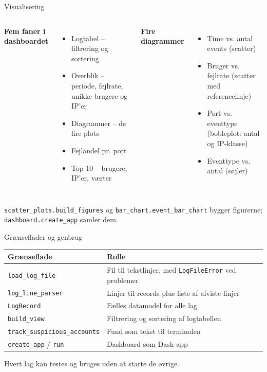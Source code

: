 \documentclass[aspectratio=169,10pt]{beamer}
\newcommand{\code}[1]{\texttt{\small #1}}
\begin{document}
\begin{frame}{Visualisering}
  \begin{columns}[T]
      \textbf{Fem faner i dashboardet}
      \vspace{0.3em}
      \begin{itemize}
        \item Logtabel -- filtrering og sortering
        \item Overblik -- periode, fejlrate, unikke brugere og IP'er
        \item Diagrammer -- de fire plots
        \item Fejlandel pr. port
        \item Top 10 -- brugere, IP'er, værter
      \end{itemize}
      \textbf{Fire diagrammer}
      \vspace{0.3em}
      \begin{itemize}
        \item Time vs. antal events (scatter)
        \item Bruger vs. fejlrate (scatter med referencelinje)
        \item Port vs. eventtype (bobleplot: antal og IP-klasse)
        \item Eventtype vs. antal (søjler)
      \end{itemize}
  \end{columns}
  \vfill
  {\footnotesize\color{muted}\code{scatter\_plots.build\_figures} og \code{bar\_chart.event\_bar\_chart} bygger figurerne; \code{dashboard.create\_app} samler dem.}
\end{frame}

\begin{frame}{Grænseflader og genbrug}
  \centering
  \small
  \begin{tabularx}{\textwidth}{@{}l X@{}}
    \toprule
    \textbf{Grænseflade} & \textbf{Rolle} \\
    \midrule
    \code{load\_log\_file}        & Fil til tekstlinjer, med \code{LogFileError} ved problemer \\
    \code{log\_line\_parser}      & Linjer til records plus liste af afviste linjer \\
    \code{LogRecord}              & Fælles datamodel for alle lag \\
    \code{build\_view}            & Filtrering og sortering af logtabellen \\
    \code{track\_suspicious\_accounts} & Fund som tekst til terminalen \\
    \code{create\_app} / \code{run}    & Dashboard som Dash-app \\
    \bottomrule
  \end{tabularx}
  \vfill
  {\footnotesize\color{muted}Hvert lag kan testes og bruges uden at starte de øvrige.}
\end{frame}
\end{document}

